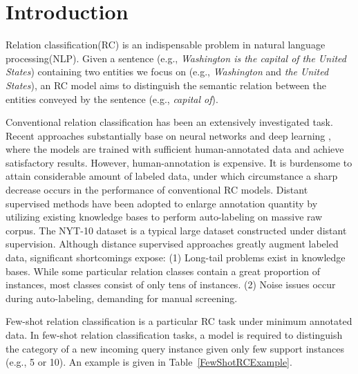 \section{Introduction}
Relation classification(RC) is an indispensable problem in natural language processing(NLP). Given a sentence (e.g., \emph{Washington is the capital of the United States}) containing two entities we focus on (e.g., \emph{Washington} and \emph{the United States}), an RC model aims to distinguish the semantic relation between the entities conveyed by the sentence (e.g., \emph{capital of}).

Conventional relation classification has been an extensively investigated task. Recent approaches substantially base on neural networks and deep learning \citep{RecursiveNNRC, zeng-etal-2014-relation, RNNRC, vu-etal-2016-combining}, where the models are trained with sufficient human-annotated data and achieve satisfactory results.
However, human-annotation is expensive. It is burdensome to attain considerable amount of labeled data, under which circumstance a sharp decrease occurs in the performance of conventional RC models.
Distant supervised methods have been adopted to enlarge annotation quantity by utilizing existing knowledge bases to perform auto-labeling on massive raw corpus. The NYT-10 dataset \citep{NYTdataset} is a typical large dataset constructed under distant supervision. Although distance supervised approaches greatly augment labeled data, significant shortcomings expose: %
(1) Long-tail problems \citep{xiong-etal-2018-one, han-etal-2018-fewrel, ye-ling-2019-multi} exist in knowledge bases. While some particular relation classes contain a great proportion of instances, most classes consist of only tens of instances.  (2) Noise issues occur during auto-labeling, demanding for manual screening.

Few-shot relation classification is a particular RC task under minimum annotated data. In few-shot relation classification tasks, a model is required to distinguish the category of a new incoming query instance given only few support instances (e.g., 5 or 10). An example is given in Table~\ref{FewShotRCExample}.

